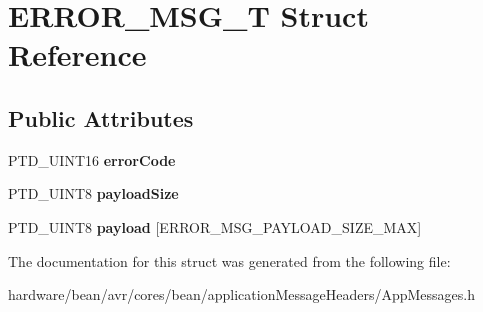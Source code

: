 \hypertarget{struct_e_r_r_o_r___m_s_g___t}{}\section{E\+R\+R\+O\+R\+\_\+\+M\+S\+G\+\_\+\+T Struct Reference}
\label{struct_e_r_r_o_r___m_s_g___t}
\subsection*{Public Attributes}
\begin{DoxyCompactItemize}
\item 
\hypertarget{struct_e_r_r_o_r___m_s_g___t_a5ebd68786cc6a3da920b024bab348688}{}P\+T\+D\+\_\+\+U\+I\+N\+T16 {\bfseries error\+Code}\label{struct_e_r_r_o_r___m_s_g___t_a5ebd68786cc6a3da920b024bab348688}

\item 
\hypertarget{struct_e_r_r_o_r___m_s_g___t_ae3c5534a4496df5e1c0bf78cc1d94d2b}{}P\+T\+D\+\_\+\+U\+I\+N\+T8 {\bfseries payload\+Size}\label{struct_e_r_r_o_r___m_s_g___t_ae3c5534a4496df5e1c0bf78cc1d94d2b}

\item 
\hypertarget{struct_e_r_r_o_r___m_s_g___t_a19a3c7a07290ee567d6e101b5a36312c}{}P\+T\+D\+\_\+\+U\+I\+N\+T8 {\bfseries payload} \mbox{[}E\+R\+R\+O\+R\+\_\+\+M\+S\+G\+\_\+\+P\+A\+Y\+L\+O\+A\+D\+\_\+\+S\+I\+Z\+E\+\_\+\+M\+A\+X\mbox{]}\label{struct_e_r_r_o_r___m_s_g___t_a19a3c7a07290ee567d6e101b5a36312c}

\end{DoxyCompactItemize}


The documentation for this struct was generated from the following file\+:\begin{DoxyCompactItemize}
\item 
hardware/bean/avr/cores/bean/application\+Message\+Headers/App\+Messages.\+h\end{DoxyCompactItemize}
